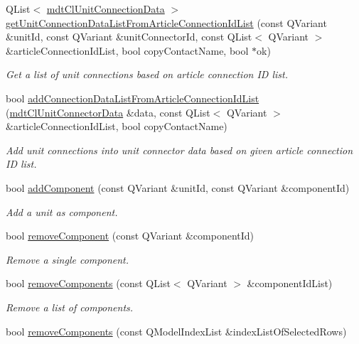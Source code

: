 \begin{DoxyCompactItemize}
Q\-List$<$ \hyperlink{classmdt_cl_unit_connection_data}{mdt\-Cl\-Unit\-Connection\-Data} $>$ \hyperlink{classmdt_cl_unit_ac593b17febfe5312230296630d61ea66}{get\-Unit\-Connection\-Data\-List\-From\-Article\-Connection\-Id\-List} (const Q\-Variant \&unit\-Id, const Q\-Variant \&unit\-Connector\-Id, const Q\-List$<$ Q\-Variant $>$ \&article\-Connection\-Id\-List, bool copy\-Contact\-Name, bool $\ast$ok)
\begin{DoxyCompactList}\small\item\em Get a list of unit connections based on article connection I\-D list. \end{DoxyCompactList}\item 
bool \hyperlink{classmdt_cl_unit_a9aa3d52f4e6d79fa003d96e04be8223e}{add\-Connection\-Data\-List\-From\-Article\-Connection\-Id\-List} (\hyperlink{classmdt_cl_unit_connector_data}{mdt\-Cl\-Unit\-Connector\-Data} \&data, const Q\-List$<$ Q\-Variant $>$ \&article\-Connection\-Id\-List, bool copy\-Contact\-Name)
\begin{DoxyCompactList}\small\item\em Add unit connections into unit connector data based on given article connection I\-D list. \end{DoxyCompactList}\item 
bool \hyperlink{classmdt_cl_unit_a2315532b648609910541e739a4217014}{add\-Component} (const Q\-Variant \&unit\-Id, const Q\-Variant \&component\-Id)
\begin{DoxyCompactList}\small\item\em Add a unit as component. \end{DoxyCompactList}\item 
bool \hyperlink{classmdt_cl_unit_aab0bc86d8ebbcd9ea1124c4e584a1fbf}{remove\-Component} (const Q\-Variant \&component\-Id)
\begin{DoxyCompactList}\small\item\em Remove a single component. \end{DoxyCompactList}\item 
bool \hyperlink{classmdt_cl_unit_a767070e07954eaf7247f26f777644f1c}{remove\-Components} (const Q\-List$<$ Q\-Variant $>$ \&component\-Id\-List)
\begin{DoxyCompactList}\small\item\em Remove a list of components. \end{DoxyCompactList}\item 
bool \hyperlink{classmdt_cl_unit_a0c8bd07382874bb2e2688f91c866892a}{remove\-Components} (const Q\-Model\-Index\-List \&index\-List\-Of\-Selected\-Rows)

\end{DoxyCompactItemize}
